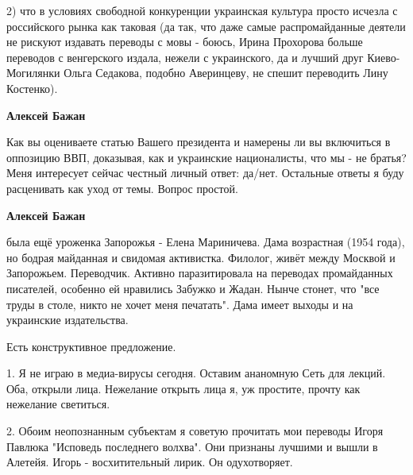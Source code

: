 \begin{itemize}
2) что в условиях свободной конкуренции украинская культура просто исчезла с
российского рынка как таковая (да так, что даже самые распромайданные деятели
не рискуют издавать переводы с мовы - боюсь, Ирина Прохорова больше переводов с
венгерского издала, нежели с украинского, да и лучший друг Киево-Могилянки
Ольга Седакова, подобно Аверинцеву, не спешит переводить Лину Костенко).

\begin{itemize}
 
\textbf{Алексей Бажан} 

Как вы оцениваете статью Вашего президента и намерены ли вы включиться в
оппозицию ВВП, доказывая, как и украинские националисты, что мы - не братья?
Меня интересует сейчас честный личный ответ: да/нет. Остальные ответы я буду
расценивать как уход от темы. Вопрос простой.


 
\textbf{Алексей Бажан} 

была ещё уроженка Запорожья - Елена Мариничева. Дама возрастная (1954 года), но
бодрая майданная и свидомая активистка. Филолог, живёт между Москвой и
Запорожьем. Переводчик. Активно паразитировала на переводах промайданных
писателей, особенно ей нравились Забужко и Жадан. Нынче стонет, что "все труды
в столе, никто не хочет меня печатать". Дама имеет выходы и на украинские
издательства.

 

Есть конструктивное предложение. 

1. Я не играю в медиа-вирусы сегодня. Оставим ананомную Сеть для лекций. Оба,
открыли лица. Нежелание открыть лица я, уж простите, прочту как нежелание
светиться. 

2. Обоим неопознанным субъектам я советую прочитать мои переводы Игоря Павлюка
"Исповедь последнего волхва". Они признаны лучшими и вышли в Алетейя. Игорь -
восхитительный лирик. Он одухотворяет.


\end{itemize}
\end{itemize}
